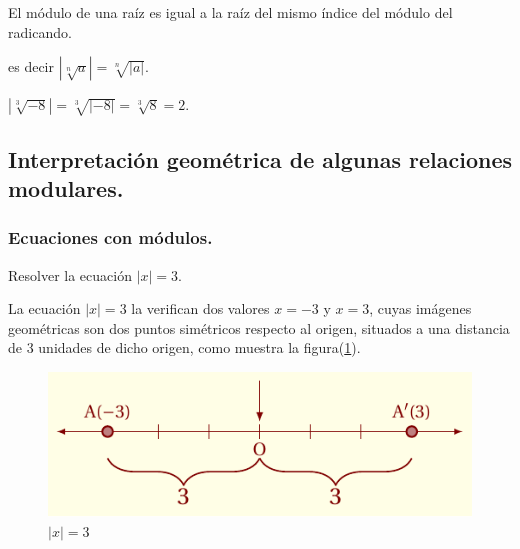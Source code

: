 \documentclass[oneside,english,spanish,2m,twoside,svgnames,x11names,HTML,twoside,12pt]{libro-matua}\usepackage[]{graphicx}\usepackage[]{color}
\newcommand{\val}[1]{\left|#1\right|}
\begin{document}
\begin{propiedad}{}

El módulo de una raíz es igual a la raíz del mismo índice del módulo
del radicando. 

\end{propiedad}

es decir $\left|\sqrt[n]{a}\right|=\sqrt[n]{\left|a\right|}$.

\begin{ejemplo}

$\left|\sqrt[3]{-8}\right|=\sqrt[3]{\left|-8\right|}=\sqrt[3]{8}=2.$

\end{ejemplo}

\subsection{Interpretación geométrica de algunas relaciones modulares.\label{subsec:Interpretaci=0000F3n-geom=0000E9trica-de}}

\subsubsection{Ecuaciones con módulos.}

\begin{ejemplo}

Resolver la ecuación $\val{x}=3.$ 

\end{ejemplo}

\sol La ecuación $\val{x}=3$ la verifican dos valores $x=-3$ y
$x=3$, cuyas imágenes geométricas son dos puntos simétricos respecto
al origen, situados a una distancia de 3 unidades de dicho origen,
como muestra la figura(\ref{fig:cal_lim1})\fin .
\begin{figure}[H]

\centering\includegraphics{2_home_antalcides_MEGA_calculo_I_libro_pdf_cal_lim1.pdf}\caption{$\val{x}=3$}\label{fig:cal_lim1}

\end{figure}
\fin
\end{document}
